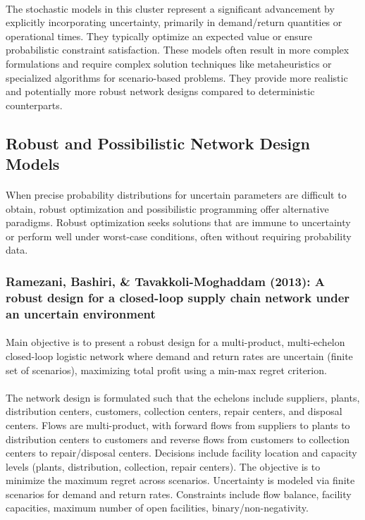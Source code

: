 \paragraph{} The stochastic models in this cluster represent a significant advancement by explicitly incorporating uncertainty, primarily in demand/return quantities or operational times. They typically optimize an expected value or ensure probabilistic constraint satisfaction. These models often result in more complex formulations and require complex solution techniques like metaheuristics or specialized algorithms for scenario-based problems. They provide more realistic and potentially more robust network designs compared to deterministic counterparts.

\subsection{Robust and Possibilistic Network Design Models}
\paragraph{} When precise probability distributions for uncertain parameters are difficult to obtain, robust optimization and possibilistic programming offer alternative paradigms. Robust optimization seeks solutions that are immune to uncertainty or perform well under worst-case conditions, often without requiring probability data.

\subsubsection{Ramezani, Bashiri, \& Tavakkoli-Moghaddam (2013): A robust design for a closed-loop supply chain network under an uncertain environment}

\paragraph{} Main objective is to present a robust design for a multi-product, multi-echelon closed-loop logistic network where demand and return rates are uncertain (finite set of scenarios), maximizing total profit using a min-max regret criterion.

\paragraph{} The network design is formulated such that the echelons include suppliers, plants, distribution centers, customers, collection centers, repair centers, and disposal centers. Flows are multi-product, with forward flows from suppliers to plants to distribution centers to customers and reverse flows from customers to collection centers to repair/disposal centers. Decisions include facility location and capacity levels (plants, distribution, collection, repair centers). The objective is to minimize the maximum regret across scenarios. Uncertainty is modeled via finite scenarios for demand and return rates. Constraints include flow balance, facility capacities, maximum number of open facilities, binary/non-negativity.

